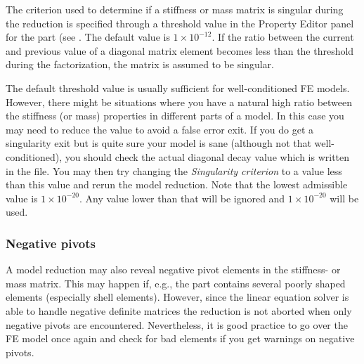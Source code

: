 {

The criterion used to determine if a stiffness or mass matrix is
singular during the reduction is specified through a threshold value in
the Property Editor panel for the part (see
.
The default value is $1\times10^{-12}$. If the ratio between the current and
previous value of a diagonal matrix element becomes less than the threshold
during the factorization, the matrix is assumed to be singular.

The default threshold value is usually sufficient for well-conditioned
FE models. However, there might be situations where you have a natural high
ratio between the stiffness (or mass) properties in different parts of a model.
In this case you may need to reduce the value to avoid a false error exit.
If you do get a singularity exit but is quite sure your model is sane (although
not that well-conditioned), you should check the actual diagonal decay value
which is written in the  file.
You may then try changing the {\sl Singularity criterion} to a value less than
this value and rerun the model reduction.
Note that the lowest admissible value is $1\times10^{-20}$.
Any value lower than that will be ignored and $1\times10^{-20}$ will be used.

\subsubsection{Negative pivots}

A model reduction may also reveal negative pivot elements in the stiffness- or
mass matrix. This may happen if, e.g., the part contains several poorly shaped
elements (especially shell elements).
However, since the linear equation solver is able to handle negative definite
matrices the reduction is not aborted when only negative pivots are encountered.
Nevertheless, it is good practice to go over the FE model once again and check
for bad elements if you get warnings on negative pivots.



}

